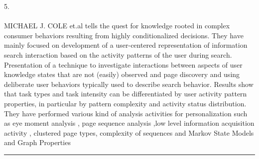 5.\\ \\ MICHAEL J. COLE et.al tells the quest for knowledge rooted in complex consumer behaviors resulting
from highly conditionalized decisions. They have mainly focused on development of a user-centered
representation of information search interaction based on the activity patterns of the user during search.
Presentation of a technique to investigate interactions between aspects of user knowledge states that are
not (easily) observed and page discovery and using deliberate user behaviors typically used to describe
search behavior. Results show that task types and task intensity can be differentiated by user activity
pattern properties, in particular by pattern complexity and activity status distribution. They have
performed various kind of analysis activities for personalization such as eye moment analysis , page
sequence analysis ,low level information acquisition activity , clustered page types, complexity of
sequences and Markov State Models and Graph Properties
\vspace{10mm}
\hrule
